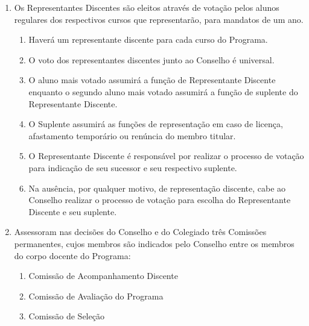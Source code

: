 \documentclass{article}
\newcommand{\grupoMenor}{Colegiado\xspace}
\newcommand{\grupoMaior}{Conselho\xspace}
\begin{document}
\begin{enumerate}
	\item Os Representantes Discentes são eleitos através de votação pelos alunos regulares dos respectivos cursos que representarão, para mandatos de um ano.
	\begin{enumerate}
		\item Haverá um representante discente para cada curso do Programa.
		\item O voto dos representantes discentes junto ao \grupoMaior é universal.
		\item O aluno mais votado assumirá a função de Representante Discente enquanto o segundo aluno mais votado assumirá a função de suplente do Representante Discente.
		\item O Suplente assumirá as funções de representação em caso de licença, afastamento temporário ou renúncia do membro titular.
		\item O Representante Discente é responsável por realizar o processo de votação para indicação de seu sucessor e seu respectivo suplente.
		\item Na ausência, por qualquer motivo, de representação discente, cabe ao \grupoMaior realizar o processo de votação para escolha do Representante Discente e seu suplente.
	\end{enumerate}	

	\item Assessoram nas decisões do \grupoMaior e do \grupoMenor três Comissões permanentes, cujos membros são indicados pelo \grupoMaior entre os membros do corpo docente do Programa:
	\begin{enumerate}[label=\Roman*]
		\item Comissão de Acompanhamento Discente
		\item Comissão de Avaliação do Programa
		\item Comissão de Seleção
	\end{enumerate}

\end{enumerate}
\end{document}
